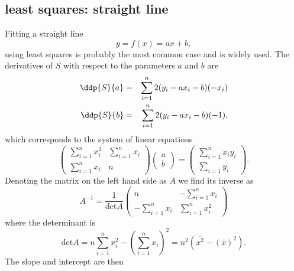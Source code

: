 \subsection{least squares: straight line}
Fitting a straight line
\begin{equation}
 y = f(x) = ax +b,
\end{equation}
 using least squares is probably the most common case and is widely used.
The derivatives of $S$ with respect to the parameters $a$ and $b$ are
\begin{eqnarray*}
 \ddp{S}{a} &=& \sum_{i=1}^n 2(y_i - ax_i -b) (-x_i) \\
 \ddp{S}{b} &=& \sum_{i=1}^n 2 (y_i - ax_i -b) (-1),
\end{eqnarray*}
which corresponds to the system of linear equations
\begin{equation} \label{eq:ls_equations}
 \left( \begin{array}{cc}    
    \sum_{i=1}^n x_i^2  & \sum_{i=1}^n x_i  \\
    \sum_{i=1}^n x_i    & n
 \end{array}\right) 
 \left( \begin{array}{c}
    a \\ b        
 \end{array} \right)
 =
 \left( \begin{array}{c}
    \sum_{i=1}^n x_i y_i \\  \sum_{i=1} y_i        
 \end{array} \right).
\end{equation}
Denoting the matrix on the left hand side as $A$ we find its inverse as
\begin{equation} \label{eq:ls_inverse}
 A^{-1} = \frac1{\mathrm{det} A}\left( \begin{array}{cc}
                  n & - \sum_{i=1}^n x_i\\ -\sum_{i=1}^n x_i & \sum_{i=1}^n x_i^2
                 \end{array} \right)
\end{equation}
where the determinant is
$$
\mathrm{det} A = n \sum_{i=1}^n x_i^2 - \left( \sum_{i=1}^n x_i \right)^2 = n^2 (\overline{x^2} - \left(\bar x\right)^2 ). 
$$
The slope and intercept are then
